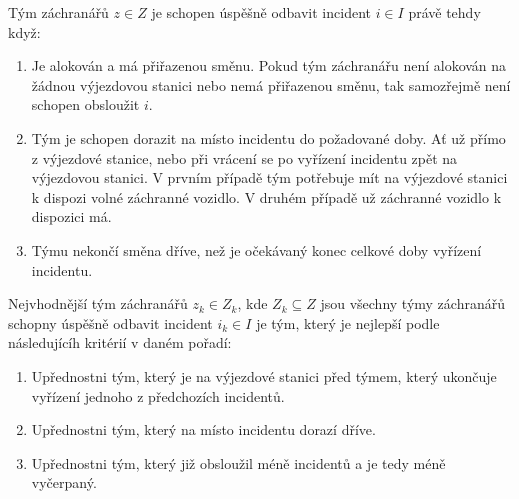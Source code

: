 \begin{definice}
  Tým záchranářů $z \in Z$ je schopen úspěšně odbavit incident $i \in I$ právě tehdy když:

  \begin{enumerate}
    \item
      Je alokován a má přiřazenou směnu. Pokud tým záchranářu není alokován na žádnou výjezdovou stanici nebo nemá přiřazenou směnu, tak samozřejmě není schopen obsloužit $i$.

    \item
      Tým je schopen dorazit na místo incidentu do požadované doby.
      Ať už přímo z výjezdové stanice, nebo při vrácení se po vyřízení incidentu zpět na výjezdovou stanici. 
      V prvním případě tým potřebuje mít na výjezdové stanici k dispozi volné záchranné vozidlo. V druhém případě už záchranné vozidlo k dispozici má.

    \item
      Týmu nekončí směna dříve, než je očekávaný konec celkové doby vyřízení incidentu.
  \end{enumerate}
\end{definice}


\begin{definice}
  Nejvhodnější tým záchranářů $z_k \in Z_k$, kde $Z_k \subseteq Z$ jsou všechny týmy záchranářů schopny úspěšně odbavit incident $i_k \in I$ je tým,
  který je nejlepší podle následujícíh kritérií v daném pořadí:

  \begin{enumerate}
    \item Upřednostni tým, který je na výjezdové stanici před týmem, který ukončuje vyřízení jednoho z předchozích incidentů. 
    \item Upřednostni tým, který na místo incidentu dorazí dříve. 
    \item Upřednostni tým, který již obsloužil méně incidentů a je tedy méně vyčerpaný.
  \end{enumerate}
\end{definice}

